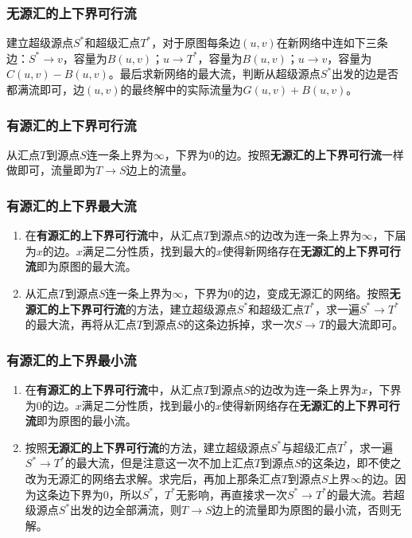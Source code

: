 \documentclass[landscape,a4paper]{article}
\begin{document}
\begin{spacing}{0.3}
\begin{multicols}{2}
\subsubsection{无源汇的上下界可行流}

建立超级源点$S^*$和超级汇点$T^*$，对于原图每条边$(u,v)$在新网络中连如下三条边：$S^* \rightarrow v$，容量为$B(u,v)$；$u \rightarrow T^*$，容量为$B(u,v)$；$u \rightarrow v$，容量为$C(u,v) - B(u,v)$。最后求新网络的最大流，判断从超级源点$S^*$出发的边是否都满流即可，边$(u,v)$的最终解中的实际流量为$G(u,v)+B(u,v)$。

\subsubsection{有源汇的上下界可行流}

从汇点$T$到源点$S$连一条上界为$\infty$，下界为$0$的边。按照\textbf{无源汇的上下界可行流}一样做即可，流量即为$T \rightarrow S$边上的流量。

\subsubsection{有源汇的上下界最大流}

\begin{enumerate}
	\item 在\textbf{有源汇的上下界可行流}中，从汇点$T$到源点$S$的边改为连一条上界为$\infty$，下届为$x$的边。$x$满足二分性质，找到最大的$x$使得新网络存在\textbf{无源汇的上下界可行流}即为原图的最大流。
	\item 从汇点$T$到源点$S$连一条上界为$\infty$，下界为$0$的边，变成无源汇的网络。按照\textbf{无源汇的上下界可行流}的方法，建立超级源点$S^*$和超级汇点$T^*$，求一遍$S^* \rightarrow T^*$的最大流，再将从汇点$T$到源点$S$的这条边拆掉，求一次$S \rightarrow T$的最大流即可。
\end{enumerate}

\subsubsection{有源汇的上下界最小流}

\begin{enumerate}
	\item 在\textbf{有源汇的上下界可行流}中，从汇点$T$到源点$S$的边改为连一条上界为$x$，下界为$0$的边。$x$满足二分性质，找到最小的$x$使得新网络存在\textbf{无源汇的上下界可行流}即为原图的最小流。
	\item 按照\textbf{无源汇的上下界可行流}的方法，建立超级源点$S^*$与超级汇点$T^*$，求一遍$S^* \rightarrow T^*$的最大流，但是注意这一次不加上汇点$T$到源点$S$的这条边，即不使之改为无源汇的网络去求解。求完后，再加上那条汇点$T$到源点$S$上界$\infty$的边。因为这条边下界为$0$，所以$S^*$，$T^*$无影响，再直接求一次$S^* \rightarrow T^*$的最大流。若超级源点$S^*$出发的边全部满流，则$T \rightarrow S$边上的流量即为原图的最小流，否则无解。
\end{enumerate}


\end{multicols}
\end{spacing}
\end{document}
